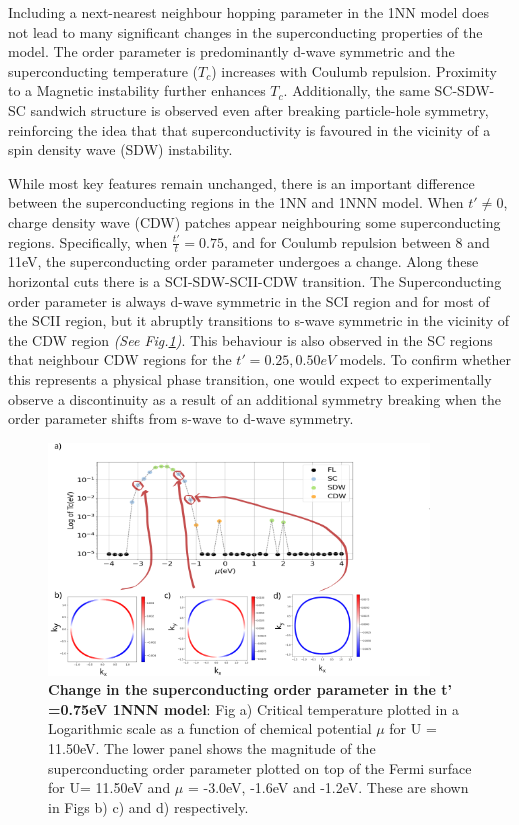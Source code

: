 \documentclass[12pt]{article}
\begin{document}
Including a next-nearest neighbour hopping parameter in the 1NN model does not lead to
many significant changes in the superconducting properties of the model. The order parameter is predominantly d-wave symmetric and the  superconducting temperature ($T_c$) increases
with Coulumb repulsion. Proximity to a Magnetic instability further enhances $T_c$.
Additionally, the same SC-SDW-SC sandwich structure is observed even after breaking particle-hole symmetry, reinforcing the 
idea that that superconductivity is favoured in the vicinity of a  spin density wave (SDW) instability. \par
\medskip
\noindent While most key features remain unchanged, there is an important difference between the superconducting regions in the 1NN and 1NNN model. 
When $t' \neq 0 $, charge density wave (CDW) patches appear neighbouring some superconducting regions.
Specifically, when $\frac{t'}{t} = 0.75$, and for Coulumb repulsion between 8 and 11eV, the superconducting order parameter undergoes a change.
Along these horizontal cuts there is a SCI-SDW-SCII-CDW transition. The Superconducting order parameter 
is always d-wave symmetric in the SCI region and for most of the SCII region, but it abruptly transitions to 
s-wave symmetric in the vicinity of the CDW region \textit{(See Fig.\ref{fig:1NNNSC})}. This behaviour is also observed in the SC regions that neighbour CDW regions for 
the $t' = 0.25, 0.50eV$ models. To confirm whether this represents a physical phase transition, one would expect to experimentally observe a 
discontinuity as a result of an additional symmetry breaking when the order parameter shifts from s-wave to d-wave symmetry.

\begin{figure}[htbp]  %
    \centering
    \includegraphics[width=0.90\textwidth]{1NNNSC_075.png}  %
    \caption{\textbf{Change in the superconducting order parameter in the t' =0.75eV 1NNN model}: Fig a) Critical temperature plotted in a Logarithmic scale
    as a function of chemical potential $\mu$ for U = 11.50eV.
    The lower panel shows the magnitude of the superconducting order parameter plotted on top of the Fermi surface for U= 11.50eV and $\mu$ = -3.0eV, -1.6eV and -1.2eV. These are shown in Figs b)
    c) and d) respectively.  }
    \label{fig:1NNNSC}
\end{figure}
\end{document}
